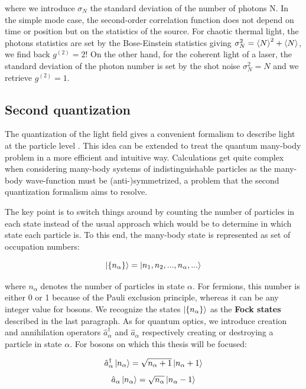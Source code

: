 where we introduce $\sigma_N$ the standard deviation of the number of photons N. In the simple mode case, the second-order correlation function does not depend on time or position but on the statistics of the source. For chaotic thermal light, the photons statistics are set by the Bose-Einstein statistics giving $\sigma_N^2=\left\langle N\right\rangle^2+\left\langle N\right\rangle$, we find back $g^{(2)}=2$! On the other hand, for the coherent light of a laser, the standard deviation of the photon number is set by the shot noise $\sigma_N^2=N$ and we retrieve $g^{(2)}=1$.

\subsection{Second quantization}

The quantization of the light field gives a convenient formalism to describe light at the particle level . This idea can be extended to treat the quantum many-body problem in a more efficient and intuitive way. Calculations get quite complex when considering many-body systems of indistinguishable particles as the many-body wave-function must be (anti-)symmetrized, a problem that the second quantization formalism aims to resolve.

The key point is to switch things around by counting the number of particles in each state instead of the usual approach which would be to determine in which state each particle is. To this end, the many-body state is represented as set of occupation numbers:

\begin{equation}
   \ket{ \{n_{\alpha}\}} = \ket{n_1,n_2,...,n_{\alpha},...}
\end{equation}

\noindent where $n_{\alpha}$ denotes the number of particles in state $\alpha$. For fermions, this number is either 0 or 1 because of the Pauli exclusion principle, whereas it can be any integer value for bosons. We recognize the states $\ket{ \{n_{\alpha}\}}$ as the \textbf{Fock states} described in the last paragraph. As for quantum optics, we introduce creation and annihilation operators $\hat{a}^{\dagger}_{\alpha}$ and $\hat{a}_{\alpha}$ respectively creating or destroying a particle in state $\alpha$. For bosons on which this thesis will be focused:

\begin{equation}
    \hat{a}_{\alpha}^{\dagger} \ket{n_{\alpha}}=\sqrt{n_{\alpha}+1}\left|n_{\alpha}+1\right\rangle
\end{equation}
\begin{equation}
    \hat{a}_{\alpha} \ket{n_{\alpha}}=\sqrt{n_{\alpha}}\left|n_{\alpha}-1\right\rangle
\end{equation}

